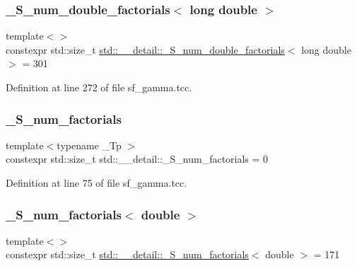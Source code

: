 \subsubsection{\texorpdfstring{\+\_\+\+S\+\_\+num\+\_\+double\+\_\+factorials$<$ long double $>$}{\_S\_num\_double\_factorials< long double >}}
{\footnotesize\ttfamily template$<$$>$ \\
constexpr std\+::size\+\_\+t \hyperlink{namespacestd_1_1____detail_a762f5ed905d1f926bfd8b16f8ea2c568}{std\+::\+\_\+\+\_\+detail\+::\+\_\+\+S\+\_\+num\+\_\+double\+\_\+factorials}$<$ long double $>$ = 301}



Definition at line 272 of file sf\+\_\+gamma.\+tcc.

\mbox{\label{namespacestd_1_1____detail_a671f3ba94c1b06be87992486bca37426}} 
\subsubsection{\texorpdfstring{\+\_\+\+S\+\_\+num\+\_\+factorials}{\_S\_num\_factorials}}
{\footnotesize\ttfamily template$<$typename \+\_\+\+Tp $>$ \\
constexpr std\+::size\+\_\+t std\+::\+\_\+\+\_\+detail\+::\+\_\+\+S\+\_\+num\+\_\+factorials = 0}



Definition at line 75 of file sf\+\_\+gamma.\+tcc.

\mbox{\label{namespacestd_1_1____detail_ad415b9ec36471d7aca4ebcd22cb7b216}} 
\subsubsection{\texorpdfstring{\+\_\+\+S\+\_\+num\+\_\+factorials$<$ double $>$}{\_S\_num\_factorials< double >}}
{\footnotesize\ttfamily template$<$$>$ \\
constexpr std\+::size\+\_\+t \hyperlink{namespacestd_1_1____detail_a671f3ba94c1b06be87992486bca37426}{std\+::\+\_\+\+\_\+detail\+::\+\_\+\+S\+\_\+num\+\_\+factorials}$<$ double $>$ = 171}



